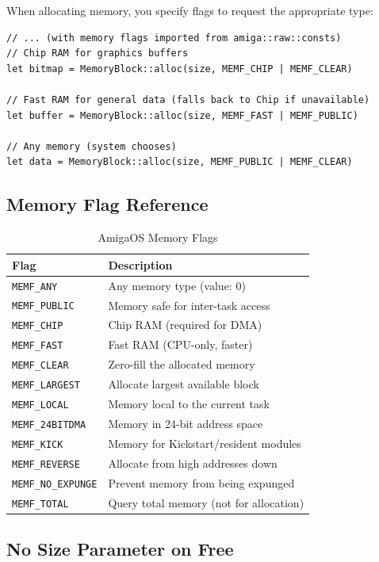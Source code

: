 When allocating memory, you specify flags to request the appropriate type:

\begin{lstlisting}
// ... (with memory flags imported from amiga::raw::consts)
// Chip RAM for graphics buffers
let bitmap = MemoryBlock::alloc(size, MEMF_CHIP | MEMF_CLEAR)

// Fast RAM for general data (falls back to Chip if unavailable)
let buffer = MemoryBlock::alloc(size, MEMF_FAST | MEMF_PUBLIC)

// Any memory (system chooses)
let data = MemoryBlock::alloc(size, MEMF_PUBLIC | MEMF_CLEAR)
\end{lstlisting}

\subsection{Memory Flag Reference}

\begin{table}[h]
\centering
\begin{tabular}{lp{9cm}}
\hline
\textbf{Flag} & \textbf{Description} \\
\hline
\texttt{MEMF\_ANY} & Any memory type (value: 0) \\
\texttt{MEMF\_PUBLIC} & Memory safe for inter-task access \\
\texttt{MEMF\_CHIP} & Chip RAM (required for DMA) \\
\texttt{MEMF\_FAST} & Fast RAM (CPU-only, faster) \\
\texttt{MEMF\_CLEAR} & Zero-fill the allocated memory \\
\texttt{MEMF\_LARGEST} & Allocate largest available block \\
\texttt{MEMF\_LOCAL} & Memory local to the current task \\
\texttt{MEMF\_24BITDMA} & Memory in 24-bit address space \\
\texttt{MEMF\_KICK} & Memory for Kickstart/resident modules \\
\texttt{MEMF\_REVERSE} & Allocate from high addresses down \\
\texttt{MEMF\_NO\_EXPUNGE} & Prevent memory from being expunged \\
\texttt{MEMF\_TOTAL} & Query total memory (not for allocation) \\
\hline
\end{tabular}
\caption{AmigaOS Memory Flags}
\end{table}

\subsection{No Size Parameter on Free}

